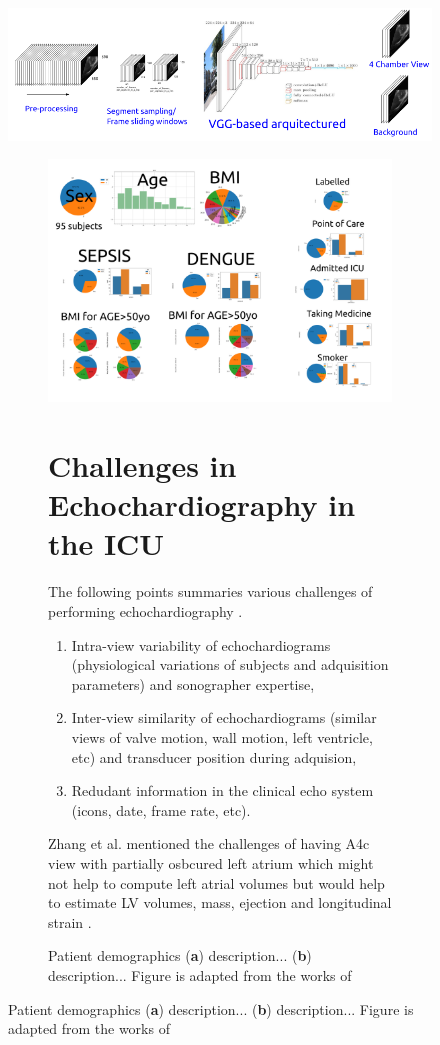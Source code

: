 \begin{figure}[H]
  \centerline{\includegraphics[width=\columnwidth]{../figures/VGG-based-arquitecture/versions/drawing-v00}}
\caption{
	VGG-based arquitecture
	(\textbf{a}) description...
	(\textbf{b}) description...
	Figure is adapted from the works of %
}

\begin{figure}[H]
  \centerline{\includegraphics[width=\columnwidth]{../figures/patient-demographics-and-diseases/versions/drawing-v00}}
\caption{
	Patient demographics
	(\textbf{a}) description...
	(\textbf{b}) description...
	Figure is adapted from the works of %
}





\section{Challenges in Echochardiography in the ICU}
The following points summaries various challenges of performing echochardiography \cite{khamis2017}.
\begin{enumerate}
  \item Intra-view variability of echochardiograms (physiological variations of subjects and adquisition parameters) and sonographer expertise,
  \item Inter-view similarity of echochardiograms (similar views of valve motion, wall motion, left ventricle, etc) and transducer position during adquision,
  \item Redudant information in the clinical echo system (icons, date, frame rate, etc).
\end{enumerate}
Zhang et al. mentioned the challenges of having A4c view with partially osbcured left atrium which might not help to compute left atrial volumes but would help to estimate LV volumes, mass, ejection and longitudinal strain \cite{zhang2018}.





\end{figure}
\end{figure}
